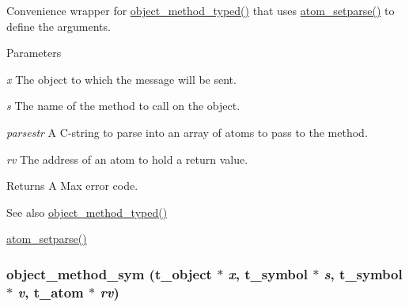 Convenience wrapper for \hyperlink{group__obj_ga443dee482af22e0fe83e68955d367226}{object\_\-method\_\-typed()} that uses \hyperlink{group__atom_ga55938aedb41a8f3565680cf29169dc70}{atom\_\-setparse()} to define the arguments. 
\begin{DoxyParams}{Parameters}
\item[{\em x}]The object to which the message will be sent. \item[{\em s}]The name of the method to call on the object. \item[{\em parsestr}]A C-\/string to parse into an array of atoms to pass to the method. \item[{\em rv}]The address of an atom to hold a return value. \end{DoxyParams}
\begin{DoxyReturn}{Returns}
A Max error code.
\end{DoxyReturn}
\begin{DoxySeeAlso}{See also}
\hyperlink{group__obj_ga443dee482af22e0fe83e68955d367226}{object\_\-method\_\-typed()} 

\hyperlink{group__atom_ga55938aedb41a8f3565680cf29169dc70}{atom\_\-setparse()} 
\end{DoxySeeAlso}
\hypertarget{group__obj_ga5ddeb48f167ded23b1508d502e571427}{
\subsubsection[{object\_\-method\_\-sym}]{ object\_\-method\_\-sym ({\bf t\_\-object} $\ast$ {\em x}, \/  {\bf t\_\-symbol} $\ast$ {\em s}, \/  {\bf t\_\-symbol} $\ast$ {\em v}, \/  {\bf t\_\-atom} $\ast$ {\em rv})}}
\label{group__obj_ga5ddeb48f167ded23b1508d502e571427}


